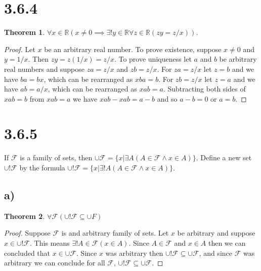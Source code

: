 \documentclass{article}
\newcommand{\F}{\mathcal{F}}
\newtheorem*{theorem}{Theorem}  %
\begin{document}
\section*{3.6.4}
\begin{theorem} $\forall x \in \mathbb{R} ( x \neq 0 \implies \exists! y \in \mathbb{R} \forall z \in \mathbb{R} (zy = z/x))$.
\end{theorem}

\begin{proof}
Let $x$ be an arbitrary real number. To prove existence, suppose $x \neq 0$ and $y = 1/x$. Then $zy = z(1/x) = z/x$. To prove uniqueness let $a$ and $b$ be arbitrary real numbers and suppose $za = z/x$ and $zb = z/x$. For $za = z/x$ let $z = b$ and we have $ba = bx$, which can be rearranged as $xba = b$. For $zb = z/x$ let $z = a$ and we have $ab = a/x$, which can be rearranged as $xab = a$. Subtracting both sides of $xab = b$ from $xab = a$ we have $xab - xab = a - b$ and so $a - b = 0$ or $a = b$.
\end{proof}

\section*{3.6.5}
If $\F$ is a family of sets, then $\cup \F = \{x | \exists A(A \in \F \land x \in A) \}$. Define a new set $\cup!\F$ by the formula $\cup ! \F = \{x | \exists! A (A \in \F \land x \in A )\}$.

\subsection*{a)}
\begin{theorem} $\forall \F (\cup ! \F \subseteq \cup F)$
\end{theorem}
\begin{proof}
Suppose $\F$ is and arbitrary family of sets. Let $x$ be arbitrary and suppose $x \in \cup! \F$. This means $\exists! A \in \F (x \in A)$. Since $A \in \F$ and $x \in A$ then we can concluded that $x \in \cup \F$. Since $x$ was arbitrary then $\cup ! \F \subseteq \cup \F$, and since $\F$ was arbitrary we can conclude for all $\F$, $\cup ! \F \subseteq \cup \F$.
\end{proof}
\end{document}
